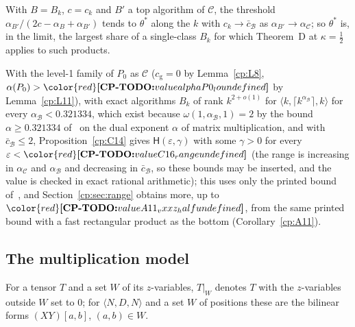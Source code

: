 \documentclass[11pt]{article}
\makeatletter
\theoremstyle{definition}
\theoremstyle{remark}
\DeclareRobustCommand{\CPTODO}[1]{{\color{red}\textbf{[CP-TODO:} #1\textbf{]}}}
\providecommand{\eps}{\varepsilon}
\newcommand{\mat}[3]{\langle #1,#2,#3\rangle} %
\newcommand{\Hyp}{\mathsf{H}}                 %
\newcommand{\alB}{\alpha_B}                   %
\newcommand{\cg}{c_{\mathrm g}}               %
\newcommand{\cbar}{\bar c}                    %
\newcommand{\ThmD}{Theorem~D}                               %
\newcommand{\Pzero}{P_0}                      %
\newcommand{\cpv}[1]{\ifcsname cpv@#1\endcsname\csname cpv@#1\endcsname\else\CPTODO{value #1 undefined}\fi}
\newcommand{\AlphaVXXZ}{0.321334}%
\makeatother
\begin{document}
With $B=B_k$, $c=c_k$ and $B'$ a top algorithm of $\mathcal C$, the threshold $\alpha_{B'}/(2c-\alB+\alpha_{B'})$ tends to $\theta^*$ along the $k$ with $c_k\to\cbar_{\mathcal B}$ as $\alpha_{B'}\to\alpha_{\mathcal C}$; so $\theta^*$ is, in the limit, the largest share of a single-class $B_k$ for which \ThmD{} at $\kappa=\frac12$ applies to such products.

\label{cp:C16}%
With the level-1 family of $\Pzero$ as $\mathcal C$ ($\cg=0$ by Lemma~\ref{cp:L8}, $\alpha(\Pzero)>\cpv{alphaP0_lo}$ by Lemma~\ref{cp:L11}), with exact algorithms $B_k$ of rank $k^{2+o(1)}$ for $\mat k{\lceil k^{\alpha_{\mathcal B}}\rceil}k$ for every $\alpha_{\mathcal B}<\AlphaVXXZ$, which exist because $\omega(1,\alpha_{\mathcal B},1)=2$ by the bound $\alpha\ge\AlphaVXXZ$ of~\cite{VXXZ24} on the dual exponent $\alpha$ of matrix multiplication, and with $\cbar_{\mathcal B}\le2$, Proposition~\ref{cp:C14} gives $\Hyp(\eps,\gamma)$ with some $\gamma>0$ for every $\eps<\cpv{C16_range}$ (the range is increasing in $\alpha_{\mathcal C}$ and $\alpha_{\mathcal B}$ and decreasing in $\cbar_{\mathcal B}$, so these bounds may be inserted, and the value is checked in exact rational arithmetic); this uses only the printed bound of~\cite{VXXZ24}, and Section~\ref{cp:sec:range} obtains more, up to $\cpv{A11_vxxz_half}$, from the same printed bound with a fast rectangular product as the bottom (Corollary~\ref{cp:A11}).

\subsection{The multiplication model}\label{cp:sec:tr:mult}

For a tensor $T$ and a set $W$ of its $z$-variables, $T|_W$ denotes $T$ with the $z$-variables outside $W$ set to $0$; for $\mat NDN$ and a set $W$ of positions these are the bilinear forms $(XY)[a,b]$, $(a,b)\in W$.
\end{document}

